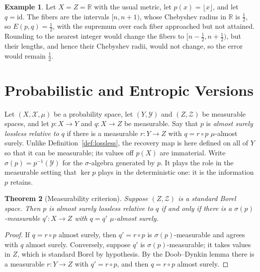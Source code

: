 \documentclass[11pt]{article}
\newtheorem{theorem}{Theorem}[section]
\theoremstyle{definition}
\newtheorem{example}[theorem]{Example}
\theoremstyle{remark}
\newcommand{\R}{\mathbb{R}}
\begin{document}
\begin{example}
Let $X=Z=\R$ with the usual metric, let $p(x)=\lfloor x\rfloor$, and let $q=\mathrm{id}$. The fibers are the intervals $[n,n+1)$, whose Chebyshev radius in $\R$ is $\tfrac12$, so $E(p,q)=\tfrac12$, with the supremum over each fiber approached but not attained. Rounding to the nearest integer would change the fibers to $[n-\tfrac12,n+\tfrac12)$, but their lengths, and hence their Chebyshev radii, would not change, so the error would remain $\tfrac12$.
\end{example}

\section{Probabilistic and Entropic Versions}\label{sec:probabilistic}

Let $(X,\mathcal X,\mu)$ be a probability space, let $(Y,\mathcal Y)$ and $(Z,\mathcal Z)$ be measurable spaces, and let $p:X\to Y$ and $q:X\to Z$ be measurable. Say that $p$ is \emph{almost surely lossless relative to} $q$ if there is a measurable $r:Y\to Z$ with $q=r\circ p$ $\mu$-almost surely. Unlike Definition~\ref{def:lossless}, the recovery map is here defined on all of $Y$ so that it can be measurable; its values off $p(X)$ are immaterial. Write $\sigma(p)=p^{-1}(\mathcal Y)$ for the $\sigma$-algebra generated by $p$. It plays the role in the measurable setting that $\ker p$ plays in the deterministic one: it is the information $p$ retains.

\begin{theorem}[Measurability criterion]\label{thm:measurable}
Suppose $(Z,\mathcal Z)$ is a standard Borel space. Then $p$ is almost surely lossless relative to $q$ if and only if there is a $\sigma(p)$-measurable $q':X\to Z$ with $q=q'$ $\mu$-almost surely.
\end{theorem}

\begin{proof}
If $q=r\circ p$ almost surely, then $q'=r\circ p$ is $\sigma(p)$-measurable and agrees with $q$ almost surely. Conversely, suppose $q'$ is $\sigma(p)$-measurable; it takes values in $Z$, which is standard Borel by hypothesis. By the Doob--Dynkin lemma \cite[Lemma~1.13]{kallenberg} there is a measurable $r:Y\to Z$ with $q'=r\circ p$, and then $q=r\circ p$ almost surely.
\end{proof}
\end{document}
